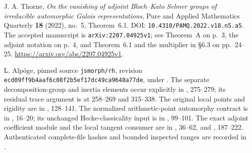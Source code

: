 J. A. Thorne, \emph{On the vanishing of adjoint Bloch--Kato Selmer
groups of irreducible automorphic Galois representations},
Pure and Applied Mathematics Quarterly \textbf{18} (2022), no.~5,
Theorem~6.1.  DOI: \texttt{10.4310/PAMQ.2022.v18.n5.a5}.
The accepted manuscript is \texttt{arXiv:2207.04925v1}; see
Theorem~A on p.~3, the adjoint notation on p.~4, and
Theorem~6.1 and the multiplier in \S6.3 on pp.~24--25.
\url{https://arxiv.org/abs/2207.04925v1}.

L. Alp\"oge, pinned source \texttt{jsmorph/rh}, revision
\texttt{ecd09ff9b4aaf6c08f2b5ef17dc49ca9648a77de}, under
.
The separate decomposition-group and inertia elements occur explicitly
in , 275--279;
its residual trace argument is at 258--269 and 315--338.
The original local points and rigidity are in
, 128--141.
The normalized arithmetic-point automorphy contract is in
,
16--20; its unchanged Hecke-classicality input is in
, 99--101.
The exact adjoint coefficient module and the local tangent consumer
are in , 36--62, and
, 187--222.
Authenticated complete-file hashes and bounded inspected ranges are
recorded in
.
